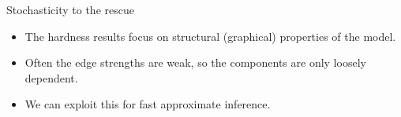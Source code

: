 \documentclass[10pt,mathserif]{beamer}
\begin{document}
\begin{frame}{Stochasticity to the rescue}
\begin{itemize}
    \item The hardness results focus on structural (graphical) properties of the model.
    \item Often the edge strengths are weak, so the components are only loosely dependent.
    \item We can exploit this for fast approximate inference.
\end{itemize}
\end{frame}
\end{document}
